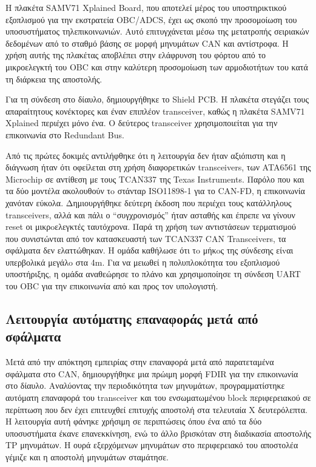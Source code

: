 \documentclass[a4paper,nobib,justified]{tufte-book}
\begin{document}
	Η πλακέτα SAMV71 Xplained Board, που αποτελεί μέρος του υποστηρικτικού εξοπλισμού για την εκστρατεία OBC/ADCS, έχει ως σκοπό την προσομοίωση του υποσυστήματος τηλεπικοινωνιών. Αυτό επιτυγχάνεται μέσω της μετατροπής σειριακών δεδομένων από το σταθμό βάσης σε μορφή μηνυμάτων CAN και αντίστροφα. Η χρήση αυτής της πλακέτας αποβλέπει στην ελάφρυνση του φόρτου από το μικροελεγκτή του OBC και στην καλύτερη προσομοίωση των αρμοδιοτήτων του κατά τη διάρκεια της αποστολής.

	Για τη σύνδεση στο δίαυλο, δημιουργήθηκε το Shield PCB. Η πλακέτα στεγάζει τους απαραίτητους κονέκτορες και έναν επιπλέον transceiver, καθώς η πλακέτα SAMV71 Xplained περιέχει μόνο ένα. Ο δεύτερος transceiver χρησιμοποιείται για την επικοινωνία στο Redundant Bus.
	
	Από τις πρώτες δοκιμές αντιλήφθηκε ότι η λειτουργία δεν ήταν αξιόπιστη και η διάγνωση ήταν ότι οφείλεται στη χρήση διαφορετικών transceivers, των ATA6561 της Microchip σε αντίθεση με τους TCAN337 της Texas Instruments. Παρόλο που και τα δύο μοντέλα ακολουθούν τo στάνταρ ISO11898-1 για το CAN-FD, η επικοινωνία χανόταν εύκολα. Δημιουργήθηκε δεύτερη έκδοση που περιέχει τους κατάλληλους transceivers, αλλά και πάλι ο “συγχρονισμός” ήταν ασταθής και έπρεπε να γίνουν reset οι μικρoελεγκτές ταυτόχρονα. Παρά τη χρήση των αντιστάσεων τερματισμού που συνιστώνται από τον κατασκευαστή των TCAN337 CAN Transceivers, τα σφάλματα δεν ελαττώθηκαν. Η ομάδα καθήλωσε ότι τo μήκoς της σύνδεσης είvαι υπερβολικά μεγάλo στα 4m. Για να μειωθεί η πολυπλοκότητα του εξοπλισμού υποστήριξης, η ομάδα αναθεώρησε το πλάνο και χρησιμοποίησε τη σύνδεση UART του OBC για την επικοινωνία από και προς τον υπολογιστή.
	\subsection{Λειτουργία αυτόματης επαναφοράς μετά από σφάλματα}
	Μετά από την απόκτηση εμπειρίας στην επαναφορά μετά από παρατεταμένα σφάλματα στο CAN, δημιουργήθηκε μια πρώιμη μορφή FDIR για την επικοινωνία στο δίαυλο. Αναλύοντας την περιοδικότητα των μηνυμάτων, προγραμματίστηκε αυτόματη επαναφορά του transceiver και του ενσωματωμένου block περιφερειακού σε περίπτωση που δεν έχει επιτευχθεί επιτυχής αποστολή στα τελευταία X δευτερόλεπτα. Η λειτουργία αυτή φάνηκε χρήσιμη σε περιπτώσεις όπου ένα από τα δύο υποσυστήματα έκανε επανεκκίνηση, ενώ το άλλο βρισκόταν στη διαδικασία αποστολής TP μηνυμάτων. Η ουρά εξερχόμενων μηνυμάτων στο περιφερειακό του αποστολέα γέμιζε και η αποστολή μηνυμάτων σταμάτησε.
\end{document}
